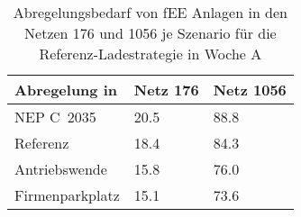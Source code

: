 {
\renewcommand{\arraystretch}{1.2}%
\begin{table}[H]
	\begin{center}
		\caption{Abregelungsbedarf von fEE Anlagen in den Netzen \num{176} und \num{1056} je Szenario für die Referenz-Ladestrategie in Woche A}
		\begin{tabu} to 0.6\textwidth {X[1.5] X[1, r] X[1, r]}
			\toprule
			Abregelung in   \si{\mwh}    & Netz \num{176} & Netz \num{1056} \\ \midrule
			NEP C~\num{2035}             & \num{20.5}     & \num{88.8}      \\
			Referenz                     & \num{18.4}     & \num{84.3}      \\
			Antriebswende                & \num{15.8}     & \num{76.0}      \\
			\glqq Firmenparkplatz\grqq{} & \num{15.1}     & \num{73.6}      \\ \bottomrule
		\end{tabu}
		\label{tab:pv_dominated_week_a_fee_cur}
	\end{center}
	\vspace{-3mm}%
\end{table}
}